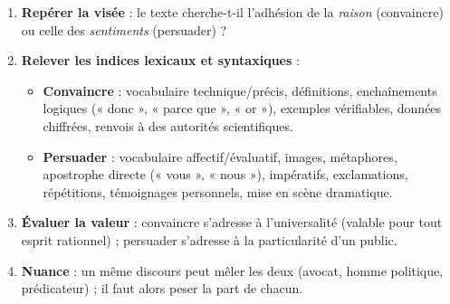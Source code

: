 \documentclass[11pt]{article}
\begin{document}
\begin{methode}
\begin{enumerate}
\item \textbf{Repérer la visée} : le texte cherche-t-il l'adhésion de la \emph{raison} (convaincre) ou celle des \emph{sentiments} (persuader) ?
\item \textbf{Relever les indices lexicaux et syntaxiques} :
  \begin{itemize}
  \item \textbf{Convaincre} : vocabulaire technique/précis, définitions, enchaînements logiques (« donc », « parce que », « or »), exemples vérifiables, données chiffrées, renvois à des autorités scientifiques.
  \item \textbf{Persuader} : vocabulaire affectif/évaluatif, images, métaphores, apostrophe directe (« vous », « nous »), impératifs, exclamations, répétitions, témoignages personnels, mise en scène dramatique.
  \end{itemize}
\item \textbf{Évaluer la valeur} : convaincre s'adresse à l'universalité (valable pour tout esprit rationnel) ; persuader s'adresse à la particularité d'un public.
\item \textbf{Nuance} : un même discours peut mêler les deux (avocat, homme politique, prédicateur) ; il faut alors peser la part de chacun.
\end{enumerate}
\end{methode}
\end{document}
